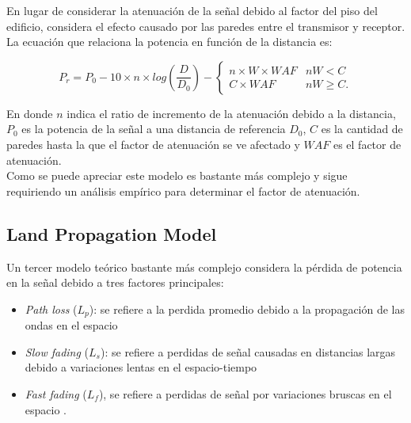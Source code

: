 \documentclass[journal]{IEEEtran}
\begin{document}
En lugar de considerar la atenuación de la señal debido al factor del piso del edificio, considera el efecto causado por las paredes entre el transmisor y receptor.\\

La ecuación que relaciona la potencia en función de la distancia es:

\begin{equation*}
P_r = P_0 - 10 \times n \times log(\frac {D} {D_0}) - \begin{cases}
n \times W \times WAF &nW < C\\
C \times WAF &nW \geq C.
\end{cases}
\end{equation*}

En donde $n$ indica el ratio de incremento de la atenuación debido a la distancia, $P_0$ es la potencia de la señal a una distancia de referencia $D_0$, $C$ es la cantidad de paredes hasta la que el factor de atenuación se ve afectado y $WAF$ es el factor de atenuación.\\

Como se puede apreciar este modelo es bastante más complejo y sigue requiriendo un análisis empírico para determinar el factor de atenuación.

\subsection{Land Propagation Model}

Un tercer modelo teórico bastante más complejo considera la pérdida de potencia en la señal debido a tres factores principales:

\begin{itemize}

\item \emph{Path loss} ($L_p$): se refiere a la perdida promedio debido a la propagación de las ondas en el espacio

\item \emph{Slow fading} ($L_s$): se refiere a perdidas de señal causadas en distancias largas debido a variaciones lentas en el espacio-tiempo \cite{introduction:wireless:mobile:systems}

\item \emph{Fast fading} ($L_f$), se refiere a perdidas de señal por variaciones bruscas en el espacio \cite{survey:propagation:models} \cite{wireless:communications}.

\end{itemize}
\end{document}
